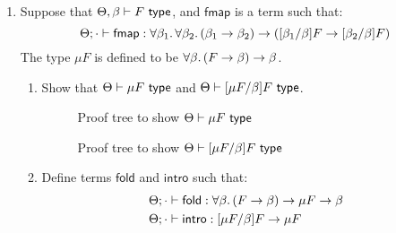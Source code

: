 \documentclass[10pt,\jkfside,a4paper]{article}
\begin{document}
\begin{enumerate}
\begin{enumerate}
    \end{enumerate}

    \item Suppose that $\Theta, \beta \vdash F\ \type$, and $\mathsf{fmap}$ is a term such that:
    \[
        \Theta; \cdot \vdash \mathsf{fmap}: \forall \beta_1\ldotp \forall \beta_2\ldotp (\beta_1 \to \beta_2) \to ([\beta_1/\beta]F \to [\beta_2/\beta]F)
    \]
    The type $\mu F$ is defined to be $\forall \beta\ldotp (F \to \beta) \to \beta$.

    \begin{enumerate}

        \item Show that $\Theta \vdash \mu F\ \type$ and $\Theta \vdash [\mu F/\beta]F\ \type$.

        \begin{figure}[H]

            \centering

            \begin{prooftree}


            \end{prooftree}

            \caption{Proof tree to show $\Theta \vdash \mu F\ \type$}

            \vspace{1em}

            \begin{prooftree}


            \end{prooftree}

            \caption{Proof tree to show $\Theta \vdash [\mu F/\beta]F\ \type$}

        \end{figure}

        \item Define terms $\mathsf{fold}$ and $\mathsf{intro}$ such that:
        \begin{align*}
            \Theta; \cdot &\vdash \mathsf{fold}: \forall \beta\ldotp (F \to \beta) \to \mu F \to \beta \\
            \Theta ; \cdot &\vdash \mathsf{intro}: [\mu F/\beta]F \to \mu F
        \end{align*}


\end{enumerate}
\end{enumerate}
\end{document}
